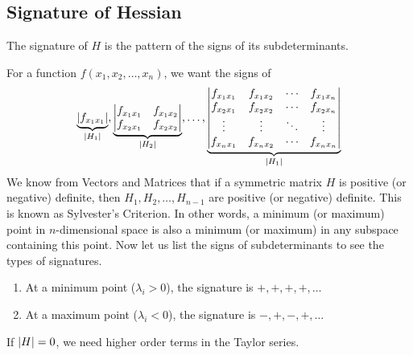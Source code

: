 \subsection{Signature of Hessian}
\begin{definition}
	The signature of \(H\) is the pattern of the signs of its subdeterminants.
\end{definition}
For a function \(f(x_1, x_2, \dots, x_n)\), we want the signs of
\[
	\underbrace{\abs{f_{x_1x_1}}}_{\abs{H_1}}, \underbrace{\begin{vmatrix}
			f_{x_1 x_1} & f_{x_1 x_2} \\
			f_{x_2 x_1} & f_{x_2 x_2}
		\end{vmatrix}}_{\abs{H_2}},\dots, \underbrace{\begin{vmatrix}
			f_{x_1 x_1} & f_{x_1 x_2} & \cdots & f_{x_1 x_n} \\
			f_{x_2 x_1} & f_{x_2 x_2} & \cdots & f_{x_2 x_n} \\
			\vdots      & \vdots      & \ddots & \vdots      \\
			f_{x_n x_1} & f_{x_n x_2} & \cdots & f_{x_n x_n}
		\end{vmatrix}}_{\abs{H_1}}
\]
We know from Vectors and Matrices that if a symmetric matrix \(H\) is positive (or negative) definite, then \(H_1, H_2, \dots, H_{n-1}\) are positive (or negative) definite.
This is known as Sylvester's Criterion.
In other words, a minimum (or maximum) point in \(n\)-dimensional space is also a minimum (or maximum) in any subspace containing this point.
Now let us list the signs of subdeterminants to see the types of signatures.
\begin{enumerate}
	\item At a minimum point (\(\lambda_i > 0\)), the signature is \(+, +, +, +, \dots\)
	\item At a maximum point (\(\lambda_i < 0\)), the signature is \(-, +, -, +, \dots\)
\end{enumerate}
If \(\abs{H} = 0\), we need higher order terms in the Taylor series.

